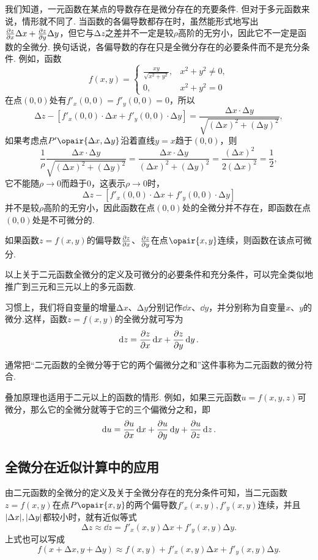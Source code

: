 我们知道，一元函数在某点的导数存在是微分存在的充要条件.
但对于多元函数来说，情形就不同了.
当函数的各偏导数都存在时，虽然能形式地写出\(\pdv{z}{x} \Delta x + \pdv{z}{y} \Delta y\)，但它与\(\increment z\)之差并不一定是较\(\rho\)高阶的无穷小，因此它不一定是函数的全微分.
换句话说，各偏导数的存在只是全微分存在的必要条件而不是充分条件.
例如，函数\[
f(x,y) = \left\{ \begin{array}{cl}
\frac{xy}{\sqrt{x^2+y^2}}, & x^2+y^2 \neq 0, \\
0, & x^2+y^2 = 0
\end{array} \right.
\]在点\((0,0)\)处有\(f'_x(0,0) = f'_y(0,0) = 0\)，所以\[
\increment z - [f'_x(0,0) \cdot \increment x + f'_y(0,0) \cdot \increment y]
= \frac{\increment x \cdot \increment y}{\sqrt{(\increment x)^2+(\increment y)^2}},
\]如果考虑点\(P'\opair{\increment x,\increment y}\)沿着直线\(y=x\)趋于\((0,0)\)，则\[
\frac{1}{\rho} \frac{\increment x \cdot \increment y}{\sqrt{(\increment x)^2+(\increment y)^2}}
= \frac{\increment x \cdot \increment y}{(\increment x)^2+(\increment y)^2}
= \frac{(\increment x)^2}{2(\increment x)^2}
= \frac{1}{2},
\]它不能随\(\rho\to0\)而趋于\(0\)，这表示\(\rho\to0\)时，\[
\increment z - [f'_x(0,0) \cdot \increment x + f'_y(0,0) \cdot \increment y]
\]并不是较\(\rho\)高阶的无穷小，因此函数在点\((0,0)\)处的全微分并不存在，即函数在点\((0,0)\)处是不可微分的.

\begin{theorem}[充分条件]\label{theorem:多元函数微分法.二元函数可微的充分条件}
如果函数\(z=f(x,y)\)的偏导数\(\pdv{z}{x}\)、\(\pdv{z}{y}\)在点\(\opair{x,y}\)连续，则函数在该点可微分.
\end{theorem}

以上关于二元函数全微分的定义及可微分的必要条件和充分条件，可以完全类似地推广到三元和三元以上的多元函数.

习惯上，我们将自变量的增量\(\increment x\)、\(\increment y\)分别记作\(\dd{x}\)、\(\dd{y}\)，并分别称为自变量\(x\)、\(y\)的微分.这样，函数\(z=f(x,y)\)的全微分就可写为\[
\dd{z}=\pdv{z}{x}\dd{x}+\pdv{z}{y}\dd{y}.
\]

通常把“二元函数的全微分等于它的两个偏微分之和”这件事称为二元函数的微分符合.

叠加原理也适用于二元以上的函数的情形.
例如，如果三元函数\(u = f(x,y,z)\)可微分，那么它的全微分就等于它的三个偏微分之和，即\[
\dd{u} = \pdv{u}{x} \dd{x} + \pdv{u}{y} \dd{y} + \pdv{u}{z} \dd{z}.
\]

\subsection{全微分在近似计算中的应用}
由二元函数的全微分的定义及关于全微分存在的充分条件可知，当二元函数\(z = f(x,y)\)在点\(P\opair{x,y}\)的两个偏导数\(f'_x(x,y),f'_y(x,y)\)连续，并且\(\abs{\Delta x},\abs{\Delta y}\)都较小时，就有近似等式\[
\increment z \approx \dd{z} = f'_x(x,y) \increment x + f'_y(x,y) \increment y.
\]上式也可以写成\[
f(x+\increment x,y+\increment y) \approx f(x,y) + f'_x(x,y) \increment x + f'_y(x,y) \increment y.
\]

